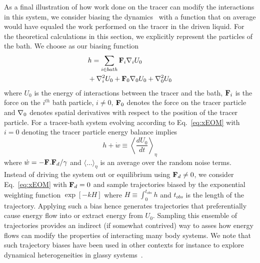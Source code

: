 \documentclass[pre,amsmath,preprintnumbers,10pt,article,notitlepage,twocolumn]{revtex4-1}
\begin{document}
As a final illustration of how work done on the tracer can modify the interactions in this system, we consider biasing the dynamics~\cite{Chetrite2013,Jack2010} with a function that on average would have equaled the work performed on the tracer in the driven liquid. For the theoretical calculations in this section, we explicitly represent the particles of the bath. We choose as our biasing function
\begin{equation}
\begin{split}
&h =\sum_{i \in bath} {\bf F}_i \nabla_i U_0 \\ &+\nabla^2_i U_0+{\bf F}_{0} \nabla_0 U_0 +\nabla^2_0 U_0  
\end{split}
\label{eq:biasingfunction}
\end{equation}
where $U_0$ is the energy of interactions between the tracer and the bath, ${\bf F}_i$ is the force on the $i^{th}$ bath particle, $i \neq 0$, ${\bf F}_0$ denotes the force on the tracer particle and ${\bf \nabla}_0$ denotes spatial derivatives with respect to the position of the tracer particle. For a tracer-bath system evolving according to Eq.~\ref{eq:xEOM} with $i=0$ denoting the tracer particle energy balance implies 
\begin{equation}
h+\dot{w} \equiv \left\langle \frac{d U_0}{dt}\right \rangle_{\eta}
\label{eq:defbias}
\end{equation}
where $\dot{w}=-{\bf F}. {\bf F}_d/\gamma$ and $\langle \dots\rangle_\eta$ is an average over the random noise terms. Instead of driving the system out or equilibrium using ${\bf F}_d\neq 0$, we consider Eq.~\ref{eq:xEOM} with ${\bf F}_d =0$ and sample trajectories biased by the exponential weighting function $\exp\left[-k H \right]$ where $H\equiv \int_0^{t_{obs}} h$ and $t_{obs}$ is the length of the trajectory.  Applying such a bias hence generates trajectories that preferentially cause energy flow into or extract energy from $U_0$. Sampling this ensemble of trajectories provides an indirect (if somewhat contrived) way to asses how energy flows can modify the properties of interacting many body systems. We note that such trajectory biases have been used in other contexts for instance to explore dynamical heterogeneities in glassy systems~\cite{Hedges2009}. 
\end{document}
